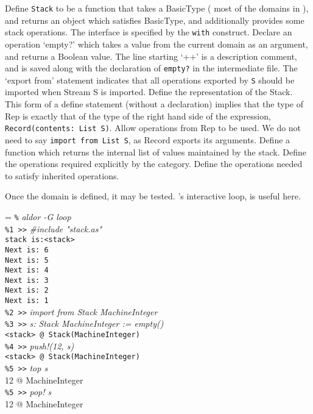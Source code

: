 \begin{description}
 Define {\tt Stack} to be a function that takes a
BasicType (\ie{} most of the domains in \asharp{}),
and returns an object which satisfies
BasicType, and additionally provides some stack operations. The
interface is specified by the {\tt with} construct.
 Declare an operation `empty?' which takes a value from the
current domain as an argument, and returns a Boolean value.
The line starting `++' is a description comment, and is saved along
with the declaration of {\tt empty?} in the intermediate file.
 The `export from' statement indicates that all operations
exported by {\tt S} should be imported when Stream S is imported. 
 Define the representation of the Stack. This form of a
define statement (without a declaration) implies that the type of Rep
is exactly that of the type of the right hand side of the expression,
\ie{} {\tt Record(contents: List S)}.
 Allow operations from Rep to be used. We do not need to say
{\tt import from List S}, as Record exports its arguments.
 Define a function which returns the internal list of values
maintained by the stack. 
 Define the operations required explicitly by the category.
 Define the operations needed to satisfy inherited operations.
\end{description}

\newpage
Once the domain is defined, it may be tested. \asharp{}'s interactive
loop,  is useful here.
\begin{flushleft}\small\leftskip=\baseLeftSkip
\verb+%+ {\em aldor -G loop}			\\
\verb+%1 >>+ {\em \#include "stack.as"}	\\
\verb+stack is:<stack>+\\
\verb+Next is: 6+\\
\verb+Next is: 5+\\
\verb+Next is: 4+\\
\verb+Next is: 3+\\
\verb+Next is: 2+\\
\verb+Next is: 1+\\
\verb+%2 >>+ {\em import from Stack MachineInteger}	\\
\verb+%3 >>+ {\em s: Stack MachineInteger := empty()}	\\
\verb+<stack> @ Stack(MachineInteger)+			\\
\verb+%4 >>+ {\em push!(12, s)}		\\
\verb+<stack> @ Stack(MachineInteger)+	\\
\verb+%5 >>+ {\em top s}	\\
12 @ MachineInteger		\\
\verb+%5 >>+ {\em pop! s}	\\
12 @ MachineInteger
\end{flushleft}

